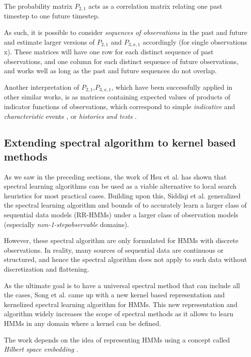 The probability matrix $ {P}_{2,1} $  acts as a correlation matrix relating one past timestep to one future timestep.

As such, it is possible to consider \textit{sequences of
observations} in the past and future and estimate larger
versions of $ {P}_{2,1} $  and $ {P}_{3,x,1} $  accordingly (for single observations
x). These matrices will have one row for each
distinct sequence of past observations, and one column
for each distinct sequence of future observations, and works well as long as the past and future sequences do not overlap.


Another interpretation of $ {P}_{2,1} $,$ {P}_{3,x,1} $, which have been successfully applied in other similar works, is as matrices containing expected values of products of indicator functions of observations, which correspond to simple \textit{indicative} and \textit{characteristic} events \cite{ref9},
or \textit{histories and tests} \cite{ref10}.


\subsection{Extending spectral algorithm to kernel based methods}

As we saw in the preceding sections, the work of Hsu et al.\cite{ref2} has shown that spectral learning algorithms can be used as a viable alternative to local search heuristics for most practical cases. Building upon this, Siddiqi et al.\cite{ref7} generalized the spectral learning algorithm
and bounds of \cite{ref2} to accurately learn
a larger class of sequential data models (RR-HMMs)
under a larger class of observation models (especially \textit{non-1-stepobservable} domains).


However, these spectral algorithm are only formulated
for HMMs with discrete observations.
In reality, many sources of sequential data are continuous or structured, and hence the spectral algorithm does not apply to such data without discretization and flattening.

As the ultimate goal is to have a universal spectral method that can include all the cases, Song et al.\cite{ref20} came up with a new kernel based
representation and kernelized spectral learning
algorithm for HMMs. This new representation and algorithm widely increases the scope of spectral methods as it allows to learn HMMs in any domain where a kernel can be defined. 


The work depends on the idea of representing HMMs using a 
concept called \textit{Hilbert space embedding} \cite{ref21} \cite{ref22}. 

